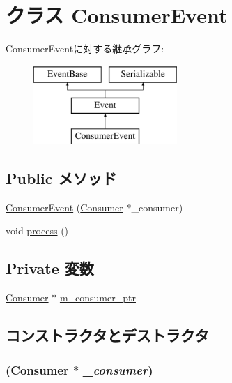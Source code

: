 \hypertarget{classConsumer_1_1ConsumerEvent}{
\section{クラス ConsumerEvent}
\label{classConsumer_1_1ConsumerEvent}
}
ConsumerEventに対する継承グラフ:\begin{figure}[H]
\begin{center}
\leavevmode
\includegraphics[height=3cm]{classConsumer_1_1ConsumerEvent}
\end{center}
\end{figure}
\subsection*{Public メソッド}
\begin{DoxyCompactItemize}
\item 
\hyperlink{classConsumer_1_1ConsumerEvent_a3672a9020a15d5a62295d05c46d54313}{ConsumerEvent} (\hyperlink{classConsumer}{Consumer} $\ast$\_\-consumer)
\item 
void \hyperlink{classConsumer_1_1ConsumerEvent_a2e9c5136d19b1a95fc427e0852deab5c}{process} ()
\end{DoxyCompactItemize}
\subsection*{Private 変数}
\begin{DoxyCompactItemize}
\item 
\hyperlink{classConsumer}{Consumer} $\ast$ \hyperlink{classConsumer_1_1ConsumerEvent_a83dd1dc8eef330b0c0d184a4167b26b4}{m\_\-consumer\_\-ptr}
\end{DoxyCompactItemize}


\subsection{コンストラクタとデストラクタ}
\hypertarget{classConsumer_1_1ConsumerEvent_a3672a9020a15d5a62295d05c46d54313}{
\subsubsection[{ConsumerEvent}]{ ({\bf Consumer} $\ast$ {\em \_\-consumer})}}
\label{classConsumer_1_1ConsumerEvent_a3672a9020a15d5a62295d05c46d54313}



